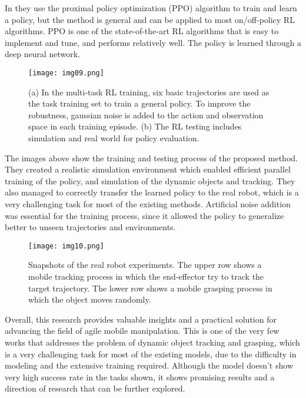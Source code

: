 In \cite{wang2022multitask} they use the proximal policy optimization (PPO) algorithm to train
and learn a policy, but the method is general and can be applied to most on/off-policy RL algorithms.
PPO is one of the state-of-the-art RL algorithms that is easy to implement and tune, and performs
relatively well. The policy is learned through a deep neural network.

\begin{figure}[H]
	\centering
	\texttt{[image: img09.png]}
	\captionsetup{width=1\linewidth}
	\caption{(a) In the multi-task RL training, six basic trajectories are used as the task
		training set to train a general policy. To improve the robustness, gaussian noise is added
		to the action and observation space in each training episode. (b) The RL testing includes
		simulation and real world for policy evaluation.\cite{wang2022multitask}}
	\label{fig:img09}
\end{figure}

The images above show the training and testing process of the proposed method. They created a
realistic simulation environment which enabled efficient parallel training of the policy,
and simulation of the dynamic objects and tracking. They also managed to correctly transfer the
learned policy to the real robot, which is a very challenging task for most of the existing methods.
Artificial noise addition was essential for the training process, since it allowed the policy
to generalize better to unseen trajectories and environments.

\begin{figure}[H]
	\centering
	\texttt{[image: img10.png]}
	\captionsetup{width=1\linewidth}
	\caption{Snapshots of the real robot experiments. The upper row shows a mobile
		tracking process in which the end-effector try to track the target trajectory.
		The lower row shows a mobile grasping process in which the object moves
		randomly. \cite{wang2022multitask}}
	\label{fig:img10}
\end{figure}

Overall, this research provides valuable insights and a practical solution for advancing the
field of agile mobile manipulation. This is one of the very few works that addresses the
problem of dynamic object tracking and grasping, which is a very challenging task for most
of the existing models, due to the difficulty in modeling and the extensive training required. Although
the model doesn't show very high success rate in the tasks shown, it shows promising results
and a direction of research that can be further explored.


